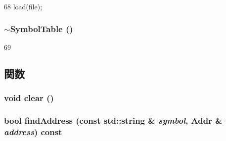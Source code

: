 \begin{DoxyCode}
68 { load(file); }
\end{DoxyCode}
\hypertarget{classSymbolTable_a7287b454c50232a03ae1ccd90d952d02}{
\subsubsection[{$\sim$SymbolTable}]{\setlength{\rightskip}{0pt plus 5cm}$\sim${\bf SymbolTable} ()}}
\label{classSymbolTable_a7287b454c50232a03ae1ccd90d952d02}



\begin{DoxyCode}
69 {}
\end{DoxyCode}


\subsection{関数}
\hypertarget{classSymbolTable_ac8bb3912a3ce86b15842e79d0b421204}{
\subsubsection[{clear}]{\setlength{\rightskip}{0pt plus 5cm}void clear ()}}
\label{classSymbolTable_ac8bb3912a3ce86b15842e79d0b421204}
\hypertarget{classSymbolTable_a14c997354df4213240205fe85d61a504}{
\subsubsection[{findAddress}]{\setlength{\rightskip}{0pt plus 5cm}bool findAddress (const std::string \& {\em symbol}, \/  {\bf Addr} \& {\em address}) const}}
\label{classSymbolTable_a14c997354df4213240205fe85d61a504}



